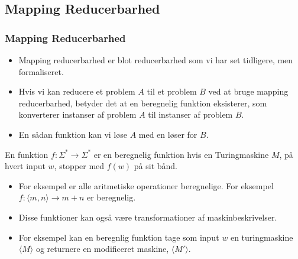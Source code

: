 \subsection{Mapping Reducerbarhed}%
\label{subsec:mapping}

\begin{frame}[allowframebreaks]
	\frametitle{Mapping Reducerbarhed}
	\begin{itemize}
		\item Mapping reducerbarhed er blot reducerbarhed som vi har set tidligere, men formaliseret.
		\item Hvis vi kan reducere et problem $A$ til et problem $B$ ved at bruge mapping reducerbarhed, betyder det at en beregnelig funktion eksisterer, som konverterer instanser af problem $A$ til instanser af problem $B$.
		\item En sådan funktion  kan vi løse $A$ med en løser for $B$.
	\end{itemize}


	\begin{definition}
		En funktion $f : \Sigma^{*} \longrightarrow \Sigma^{*}$ er en beregnelig funktion hvis en Turingmaskine $M$, på hvert input $w$, stopper med $f(w)$ på sit bånd.
	\end{definition}

	\begin{itemize}
		\item For eksempel er alle aritmetiske operationer beregnelige. For eksempel $f : \langle m , n \rangle \rightarrow m + n$ er beregnelig.
		\item Disse funktioner kan også være transformationer af maskinbeskrivelser.
		\item For eksempel kan en beregnlig funktion tage som input $w$ en turingmaskine $\langle M \rangle $ og returnere en modificeret maskine, $\langle M' \rangle $.
	\end{itemize}
\end{frame}

